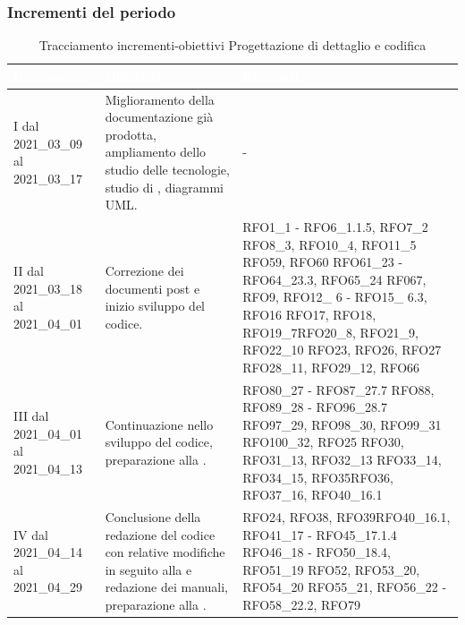 \subsubsection{Incrementi del periodo}\label{IncrementiPDettaglio}
\begin{table}[H]
	\begin{center}
		\begin{tabular}{ |C{3cm} C{6cm} C{7cm}| }
			\textcolor{white}{\textbf{Incremento}} & \textcolor{white}{\textbf{Obiettivi}} & \textcolor{white}{\textbf{Requisiti}} \\ \hline
			I dal 2021\_03\_09 al 2021\_03\_17& Miglioramento della documentazione già prodotta, ampliamento dello studio delle tecnologie, studio di , diagrammi UML.  & - \\ \hline
			II dal 2021\_03\_18 al 2021\_04\_01 	& Correzione dei documenti post  e inizio sviluppo del codice. &  
			RFO1\_1 - RFO6\_1.1.5, RFO7\_2 \newline
			RFO8\_3, RFO10\_4, RFO11\_5 \newline
			RFO59, RFO60 \newline
			RFO61\_23 - RFO64\_23.3, RFO65\_24 \newline
			RF067,  RFO9, \newline 
			RFO12\_ 6 - RFO15\_ 6.3, RFO16 \newline RFO17, RFO18, RFO19\_7\newline RFO20\_8, RFO21\_9, RFO22\_10 \newline RFO23, RFO26, RFO27 \newline RFO28\_11, RFO29\_12, RFO66\\ \hline
			III dal 2021\_04\_01 al 2021\_04\_13	& Continuazione nello sviluppo del codice, preparazione alla . & RFO80\_27 - RFO87\_27.7 \newline
			RFO88, RFO89\_28 - RFO96\_28.7 \newline
			RFO97\_29, RFO98\_30, RFO99\_31 \newline
			RFO100\_32, RFO25 \newline RFO30, RFO31\_13, RFO32\_13 \newline RFO33\_14, RFO34\_15, RFO35\newline  RFO36, RFO37\_16, RFO40\_16.1 \\ \hline
			IV dal 2021\_04\_14 al 2021\_04\_29 	& 
			Conclusione della redazione del codice con relative modifiche in seguito alla  e redazione dei manuali, preparazione alla . & RFO24, RFO38, RFO39\newline RFO40\_16.1,
			RFO41\_17 - RFO45\_17.1.4\newline
			RFO46\_18 - RFO50\_18.4, RFO51\_19 \newline
			RFO52, RFO53\_20, RFO54\_20 \newline
			RFO55\_21, RFO56\_22 - RFO58\_22.2, 
			RFO79\\ \hline
		\end{tabular}
		\caption{Tracciamento incrementi-obiettivi Progettazione di dettaglio e codifica}
	\end{center}
\end{table}

